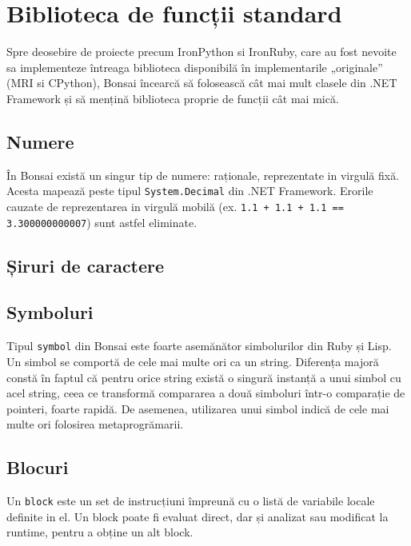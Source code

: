 \documentclass[12pt,a4paper]{memoir}
\begin{document}
\chapter{Biblioteca de funcții standard}

Spre deosebire de proiecte precum IronPython si IronRuby, care au fost nevoite sa implementeze întreaga biblioteca disponibilă în implementarile „originale” (MRI\cite{ruby_mri} si CPython\cite{cpython}), Bonsai încearcă să folosească cât mai mult clasele din .NET Framework și să mențină biblioteca proprie de funcții cât mai mică.

\section{Numere}

În Bonsai există un singur tip de numere: raționale, reprezentate in virgulă fixă. Acesta mapează peste tipul \texttt{System.Decimal} din .NET Framework. Erorile cauzate de reprezentarea in virgulă mobilă (ex. \texttt{1.1 + 1.1 + 1.1 == 3.300000000007}) sunt astfel eliminate.

\section{Șiruri de caractere}

\section{Symboluri}

Tipul \texttt{symbol} din Bonsai este foarte asemănător simbolurilor din Ruby\cite{ruby_symbols} și Lisp\cite{clhs_symbols}. Un simbol se comportă de cele mai multe ori ca un string. Diferența majoră constă în faptul că pentru orice string există o singură instanță a unui simbol cu acel string, ceea ce transformă compararea a două simboluri         într-o comparație de pointeri, foarte rapidă. De asemenea, utilizarea unui simbol indică de cele mai multe ori folosirea metaprogrămarii. 

\section{Blocuri}

Un \texttt{block} este un set de instrucțiuni împreună cu o listă de variabile locale definite in el. Un block poate fi evaluat direct, dar și analizat sau modificat la runtime, pentru a obține un alt block.
\end{document}
